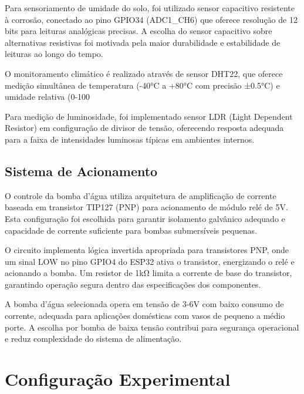 \documentclass[twoside,english,brazilian]{UNISINOSmonografia}
\begin{document}
Para sensoriamento de umidade do solo, foi utilizado sensor capacitivo resistente à corrosão, conectado ao pino GPIO34 (ADC1_CH6) que oferece resolução de 12 bits para leituras analógicas precisas. A escolha do sensor capacitivo sobre alternativas resistivas foi motivada pela maior durabilidade e estabilidade de leituras ao longo do tempo.

O monitoramento climático é realizado através de sensor DHT22, que oferece medição simultânea de temperatura (-40°C a +80°C com precisão ±0.5°C) e umidade relativa (0-100%

Para medição de luminosidade, foi implementado sensor LDR (Light Dependent Resistor) em configuração de divisor de tensão, oferecendo resposta adequada para a faixa de intensidades luminosas típicas em ambientes internos.

\subsection{Sistema de Acionamento}

O controle da bomba d'água utiliza arquitetura de amplificação de corrente baseada em transistor TIP127 (PNP) para acionamento de módulo relé de 5V. Esta configuração foi escolhida para garantir isolamento galvânico adequado e capacidade de corrente suficiente para bombas submersíveis pequenas.

O circuito implementa lógica invertida apropriada para transistores PNP, onde um sinal LOW no pino GPIO4 do ESP32 ativa o transistor, energizando o relé e acionando a bomba. Um resistor de 1kΩ limita a corrente de base do transistor, garantindo operação segura dentro das especificações dos componentes.

A bomba d'água selecionada opera em tensão de 3-6V com baixo consumo de corrente, adequada para aplicações domésticas com vasos de pequeno a médio porte. A escolha por bomba de baixa tensão contribui para segurança operacional e reduz complexidade do sistema de alimentação.


\section{Configuração Experimental}
\end{document}
